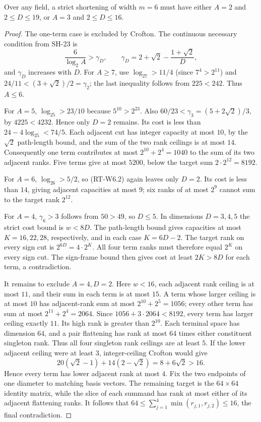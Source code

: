 \begin{proposition}
\label{rt:width-six-parameters}
Over any field, a strict shortening of width $m=6$ must have
either $A=2$ and $2\le D\le19$, or $A=3$ and $2\le D\le16$.
\end{proposition}
\begin{proof}
The one-term case is excluded by Crofton. The continuous
necessary condition from SH-23 is
\[
 \frac6{\log_2A}>\gamma_D,
 \qquad\gamma_D=2+\sqrt2-\frac{1+\sqrt2}{D},
                                                        \tag{RT-W6.2}
\]
and $\gamma_D$ increases with $D$. For $A\ge7$, use
$\log_27>11/4$ (since $7^4>2^{11}$) and
$24/11<(3+\sqrt2)/2=\gamma_2$; the last inequality follows
from $225<242$. Thus $A\le6$.

For $A=5$, $\log_25>23/10$ because $5^{10}>2^{23}$.
Also $60/23<\gamma_3=(5+2\sqrt2)/3$, by $4225<4232$.
Hence only $D=2$ remains. Its cost is less than
$24-4\log_25<74/5$. Each adjacent cut has integer
capacity at most $10$, by the $\sqrt2$ path-length bound,
and the sum of the two rank ceilings is at most $14$.
Consequently one term contributes at most
$2^{10}+2^4=1040$ to the sum of its two adjacent ranks.
Five terms give at most $5200$, below the target sum
$2\cdot2^{12}=8192$.

For $A=6$, $\log_26>5/2$, so (RT-W6.2) again leaves
only $D=2$. Its cost is less than $14$, giving adjacent
capacities at most $9$; six ranks of at most $2^9$
cannot sum to the target rank $2^{12}$.

For $A=4$, $\gamma_6>3$ follows from $50>49$, so
$D\le5$. In dimensions $D=3,4,5$ the strict cost bound
is $w<8D$. The path-length bound gives capacities at most
$K=16,22,28$, respectively, and in each case $K=6D-2$.
The target rank on every sign cut is $2^{6D}=4\cdot2^K$.
All four term ranks must therefore equal $2^K$ on every
sign cut. The sign-frame bound then gives cost at least
$2K>8D$ for each term, a contradiction.

It remains to exclude $A=4,D=2$. Here $w<16$,
each adjacent rank ceiling is at most $11$, and their
sum in each term is at most $15$. A term whose larger
ceiling is at most $10$ has adjacent-rank sum at most
$2^{10}+2^5=1056$; every other term has sum at most
$2^{11}+2^4=2064$. Since $1056+3\cdot2064<8192$,
every term has larger ceiling exactly $11$. Its high
rank is greater than $2^{10}$. Each terminal space
has dimension $64$, and a pair flattening has rank
at most $64$ times either constituent singleton rank.
Thus all four singleton rank ceilings are at least $5$.
If the lower adjacent ceiling were at least $3$,
integer-ceiling Crofton would give
\[
 20(\sqrt2-1)+14(2-\sqrt2)=8+6\sqrt2>16.
\]
Hence every term has lower adjacent rank at most $4$.
Fix the two endpoints of one diameter to matching basis
vectors. The remaining target is the $64\times64$
identity matrix, while the slice of each summand has
rank at most either of its adjacent flattening ranks.
It follows that $64\le\sum_{j=1}^4\min(r_{j,1},r_{j,2})
\le16$, the final contradiction.


\end{proof}
